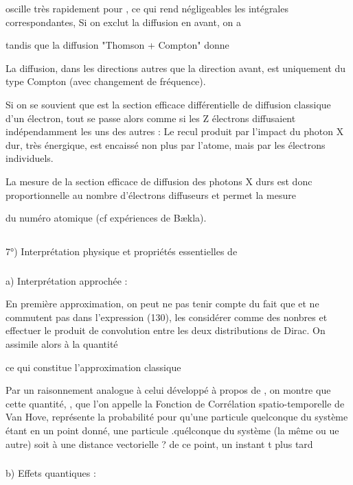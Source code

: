 oscille très rapidement
pour , ce qui rend négligeables les intégrales correspondantes, Si on
exclut la diffusion en avant, on a

tandis que la diffusion "Thomson + Compton" donne

La diffusion, dans les directions autres que la direction avant,
est uniquement du type Compton (avec changement de fréquence).

Si on se souvient que  est la section efficace
différentielle de diffusion classique d'un électron, tout se passe alors
comme si les Z électrons diffusaient indépendamment les uns des autres : Le
recul produit par l'impact du photon X dur, très énergique, est encaissé non
plus par l'atome, mais par les électrons individuels.

La mesure de la section efficace de diffusion des photons X durs
est donc proportionnelle au nombre d'électrons diffuseurs et permet la mesure

du numéro atomique (cf expériences de Bækla).
 

\subsection{}%
7°) Interprétation physique et propriétés essentielles de
\subsubsection{}%
a) Interprétation approchée :

En première approximation, on peut ne pas tenir compte du
fait que  et ne commutent pas dans l'expression (130), les
considérer comme des nonbres et effectuer le produit de convolution entre
les deux distributions de Dirac. On assimile alors  à la quantité

ce qui constitue l'approximation classique

Par un raisonnement analogue à celui développé à propos de
, on montre que cette quantité, , que l'on appelle la
Fonction de Corrélation spatio-temporelle de Van Hove, représente la probabilité
pour qu'une particule quelconque du système étant en un point donné,
une particule .quélconque du système (la même ou ue autre) soit à une distance
vectorielle ? de ce point, un instant t plus tard
\subsubsection{}%
b) Effets quantiques :

